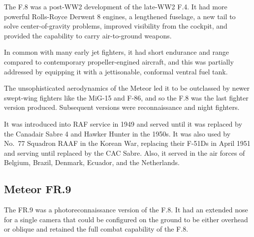 The F.8 was a post-WW2 development of the late-WW2 F.4. It had more powerful Rolls-Royce Derwent 8 engines, a lengthened fuselage, a new tail to solve center-of-gravity problems, improved visibility from the cockpit, and provided the capability to carry air-to-ground weapons.%

In common with many early jet fighters, it had short endurance and range compared to contemporary propeller-engined aircraft, and this was partially addressed by equipping it with a jettisonable, conformal ventral fuel tank.%

The unsophisticated aerodynamics of the Meteor led it to be outclassed by newer swept-wing fighters like the MiG-15 and F-86, and so the F.8 was the last fighter version produced. Subsequent versions were reconnaissance and night fighters.

It was introduced into RAF service in 1949 and served until it was replaced by the Canadair Sabre 4 and Hawker Hunter in the 1950s. It was also used by No.~77 Squadron RAAF in the Korean War, replacing their F-51Ds in April 1951 and serving until replaced by the CAC Sabre. Also, it served in the air forces of Belgium, Brazil, Denmark, Ecuador, and the Netherlands.%

\subsection{Meteor FR.9}

The FR.9 was a photoreconnaissance version of the F.8. It had an extended nose for a single camera that could be configured on the ground to be either overhead or oblique and retained the full combat capability of the F.8.%

